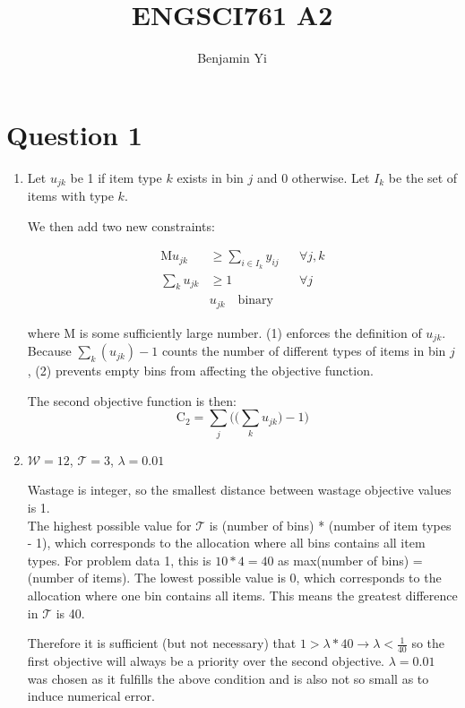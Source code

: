 \documentclass[10pt,a4paper]{article}
\begin{document}
\title{ENGSCI761 A2}
\author{Benjamin Yi}
	
\section*{Question 1}
\begin{enumerate}
\item
Let \(u_{jk}\) be 1 if item type \(k\) exists in bin \(j\) and 0 otherwise. Let \(I_k\) be the set of items with type \(k\).

We then add two new constraints:

\begin{align}
	\text{M}u_{jk} &\geq \sum_{i \in I_k} y_{ij} &&\forall j, k \\
	\sum_k u_{jk} & \geq 1 &&\forall j \\
	&u_{jk} \quad \text{binary}
\end{align}

where M is some sufficiently large number. (1) enforces the definition of \(u_{jk}\). Because \(\sum_k(u_{jk}) - 1\) counts the number of different types of items in bin \(j\), (2) prevents empty bins from affecting the objective function.

The second objective function is then:
\begin{equation*}
	\text{C}_2 = \sum_j \bigg(\bigg(\sum_k u_{jk}\bigg)-1\bigg)
\end{equation*}

\item 
\(\mathcal{W} = 12\), \(\mathcal{T} = 3\), \(\lambda = 0.01\)

Wastage is integer, so the smallest distance between wastage objective values is 1.\\
The highest possible value for \(\mathcal{T}\) is (number of bins) * (number of item types - 1), which corresponds to the allocation where all bins contains all item types. For problem data 1, this is \(10 * 4 = 40\) as max(number of bins) = (number of items). The lowest possible value is 0, which corresponds to the allocation where one bin contains all items. This means the greatest difference in \(\mathcal{T}\) is 40.

Therefore it is sufficient (but not necessary) that \(1 > \lambda * 40 \rightarrow \lambda < \frac{1}{40}\) so the first objective will always be a priority over the second objective. \(\lambda = 0.01\) was chosen as it fulfills the above condition and is also not so small as to induce numerical error.


\end{enumerate}
\end{document}
